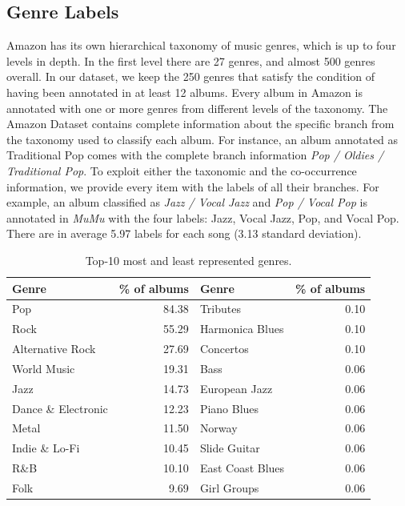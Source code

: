 \subsection{Genre Labels}\label{sec:multi-class:taxonomy}

Amazon has its own hierarchical taxonomy of music genres, which is up to four levels in depth.
In the first level there are 27 genres, and almost 500 genres overall. 
In our dataset, we keep the 250 genres that satisfy the condition of having been annotated in at least 12 albums. %
Every album in Amazon is annotated with one or more genres from different levels of the taxonomy. 
The Amazon Dataset contains complete information about the specific branch from the taxonomy used to classify each album. For instance, an album annotated as Traditional Pop comes with the complete branch information \textit{Pop / Oldies / Traditional Pop}. 
To exploit either the taxonomic and the co-occurrence information, we provide every item with the labels of all their branches. For example, an album classified as \textit{Jazz / Vocal Jazz} and \textit{Pop / Vocal Pop} is annotated in \emph{MuMu} with the four labels: Jazz, Vocal Jazz, Pop, and Vocal Pop. There are in average 5.97 labels for each song (3.13 standard deviation).

\begin{table}
\centering
\scriptsize
\label{tbl:genres}
\begin{tabular}{lr|lr}
\toprule
Genre & \% of albums & Genre & \% of albums \\
\midrule
Pop & 84.38 & Tributes & 0.10 \\
Rock & 55.29 & Harmonica Blues & 0.10 \\
Alternative Rock & 27.69 & Concertos & 0.10 \\
World Music & 19.31 & Bass & 0.06 \\
Jazz & 14.73 & European Jazz & 0.06 \\
Dance \& Electronic & 12.23 & Piano Blues & 0.06 \\
Metal & 11.50 & Norway & 0.06 \\
Indie \& Lo-Fi & 10.45 & Slide Guitar & 0.06 \\
R\&B & 10.10& East Coast Blues & 0.06 \\
Folk & 9.69 & Girl Groups & 0.06 \\
\bottomrule
\end{tabular}
\caption{Top-10 most and least represented genres.}
\end{table}

